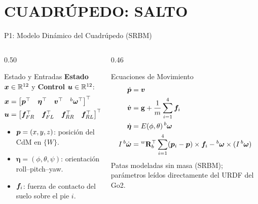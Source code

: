 \section{CUADRÚPEDO: SALTO}

\begin{frame}{P1: Modelo Dinámico del Cuadrúpedo (SRBM)}
\begin{columns}[T]
\begin{column}{0.50\textwidth}
\begin{tbox}{Estado y Entradas}
\footnotesize
\textbf{Estado} $\bm{x} \in \mathbb{R}^{12}$ y \textbf{Control} $\bm{u} \in \mathbb{R}^{12}$:
\begin{align*}
\bm{x} &= \begin{bmatrix}\bm{p}^{\top} & \bm{\eta}^{\top} & \bm{v}^{\top} & {}^b\bm{\omega}^{\top}\end{bmatrix}^{\top}\\
\bm{u} &= \begin{bmatrix}\bm{f}_{FR}^{\top} & \bm{f}_{FL}^{\top} & \bm{f}_{RR}^{\top} & \bm{f}_{RL}^{\top}\end{bmatrix}^{\top}
\end{align*}
\begin{itemize}
\item $\bm{p}=(x,y,z)$: posición del CdM en $\{W\}$.
\item $\bm{\eta}=(\phi,\theta,\psi)$: orientación roll--pitch--yaw.
\item $\bm{f}_i$: fuerza de contacto del suelo sobre el pie $i$.
\end{itemize}
\end{tbox}
\end{column}

\begin{column}{0.46\textwidth}
\begin{tbox}{Ecuaciones de Movimiento}
\footnotesize
\begin{align*}
\dot{\bm{p}} &= \bm{v} \\
\dot{\bm{v}} &= \mathbf{g} + \frac{1}{m}\sum_{i=1}^4 \bm{f}_i \\
\dot{\bm{\eta}} &= E(\phi,\theta)\,{}^b\bm{\omega} \\
I\,{}^b\dot{\bm{\omega}} &= {}^w\mathbf{R}_b^{\top} \sum_{i=1}^4 (\bm{p}_i - \bm{p})\times \bm{f}_i - {}^b\bm{\omega} \times (I\,{}^b\bm{\omega})
\end{align*}
Patas modeladas sin masa (SRBM); parámetros leídos directamente del URDF del Go2.
\end{tbox}
\end{column}
\end{columns}
\end{frame}

